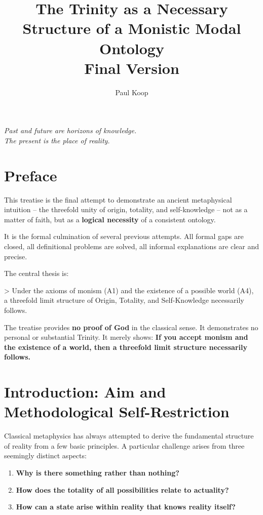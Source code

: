 \documentclass[
]{article}
\title{The Trinity as a Necessary Structure of a Monistic Modal Ontology \\ \large Final Version}
\author{Paul Koop}
\date{}
\begin{document}
\maketitle

\begin{center}
\emph{Past and future are horizons of knowledge. \\ The present is the place of reality.}
\end{center}

\newpage
{
\setcounter{tocdepth}{3}
\tableofcontents
}
\newpage

\section{Preface}\label{preface}

This treatise is the final attempt to demonstrate an ancient metaphysical intuition – the threefold unity of origin, totality, and self-knowledge – not as a matter of faith, but as a \textbf{logical necessity} of a consistent ontology.

It is the formal culmination of several previous attempts. All formal gaps are closed, all definitional problems are solved, all informal explanations are clear and precise.

The central thesis is:

> Under the axioms of monism (A1) and the existence of a possible world (A4), a threefold limit structure of Origin, Totality, and Self-Knowledge necessarily follows.

The treatise provides \textbf{no proof of God} in the classical sense. It demonstrates no personal or substantial Trinity. It merely shows: \textbf{If you accept monism and the existence of a world, then a threefold limit structure necessarily follows.}

\section{Introduction: Aim and Methodological Self-Restriction}\label{introduction-aim-and-methodological-self-restriction}

Classical metaphysics has always attempted to derive the fundamental structure of reality from a few basic principles. A particular challenge arises from three seemingly distinct aspects:

\begin{enumerate}
\item \textbf{Why is there something rather than nothing?}
\item \textbf{How does the totality of all possibilities relate to actuality?}
\item \textbf{How can a state arise within reality that knows reality itself?}
\end{enumerate}
\end{document}
